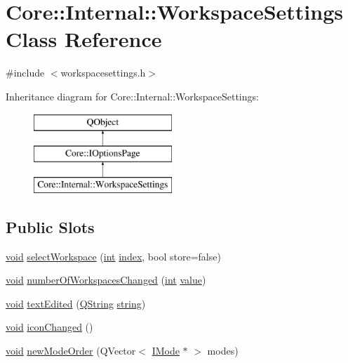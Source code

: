 \hypertarget{class_core_1_1_internal_1_1_workspace_settings}{\section{Core\-:\-:Internal\-:\-:Workspace\-Settings Class Reference}
\label{class_core_1_1_internal_1_1_workspace_settings}
}


{\ttfamily \#include $<$workspacesettings.\-h$>$}

Inheritance diagram for Core\-:\-:Internal\-:\-:Workspace\-Settings\-:\begin{figure}[H]
\begin{center}
\leavevmode
\includegraphics[height=3.000000cm]{class_core_1_1_internal_1_1_workspace_settings}
\end{center}
\end{figure}
\subsection*{Public Slots}
\begin{DoxyCompactItemize}
\item 
\hyperlink{group___u_a_v_objects_plugin_ga444cf2ff3f0ecbe028adce838d373f5c}{void} \hyperlink{group___core_plugin_ga8421af99280f278e01011e47fcb1a386}{select\-Workspace} (\hyperlink{ioapi_8h_a787fa3cf048117ba7123753c1e74fcd6}{int} \hyperlink{glext_8h_ab47dd9958bcadea08866b42bf358e95e}{index}, bool store=false)
\item 
\hyperlink{group___u_a_v_objects_plugin_ga444cf2ff3f0ecbe028adce838d373f5c}{void} \hyperlink{group___core_plugin_ga1575cedbcfaf5b3074eec04fbfc5b9a8}{number\-Of\-Workspaces\-Changed} (\hyperlink{ioapi_8h_a787fa3cf048117ba7123753c1e74fcd6}{int} \hyperlink{glext_8h_aa0e2e9cea7f208d28acda0480144beb0}{value})
\item 
\hyperlink{group___u_a_v_objects_plugin_ga444cf2ff3f0ecbe028adce838d373f5c}{void} \hyperlink{group___core_plugin_gadd1f5f6b07432b1f0ce05a0f32d2e167}{text\-Edited} (\hyperlink{group___u_a_v_objects_plugin_gab9d252f49c333c94a72f97ce3105a32d}{Q\-String} \hyperlink{glext_8h_aa81bcd27b2208041814b4beacb88c2d9}{string})
\item 
\hyperlink{group___u_a_v_objects_plugin_ga444cf2ff3f0ecbe028adce838d373f5c}{void} \hyperlink{group___core_plugin_ga5325701713e8d0b8f192ceb394317831}{icon\-Changed} ()
\item 
\hyperlink{group___u_a_v_objects_plugin_ga444cf2ff3f0ecbe028adce838d373f5c}{void} \hyperlink{group___core_plugin_ga5c72de6d843864da76c1725b05bd7382}{new\-Mode\-Order} (Q\-Vector$<$ \hyperlink{class_core_1_1_i_mode}{I\-Mode} $\ast$ $>$ modes)
\end{DoxyCompactItemize}

